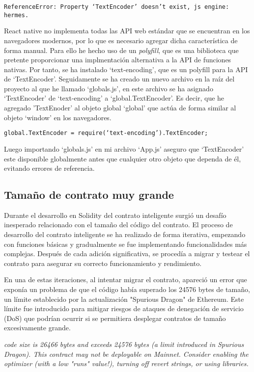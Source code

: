 \texttt{ReferenceError: Property `TextEncoder' doesn't exist, js engine: hermes.}

React native no implementa todas las API web estándar que se encuentran en los navegadores modernos, por lo que es necesario agregar dicha característica de forma manual. Para ello he hecho uso de un \textit{polyfill}, que es una biblioteca que pretente proporcionar una implmentación alternativa a la API de funciones nativas.
Por tanto, se ha instalado `text-encoding', que es un polyfill para la API de `TextEncoder'.
Seguidamente se ha creado un nuevo archivo en la raíz del proyecto al que he llamado `globals.js', en este archivo se ha asignado `TextEncoder' de `text-encoding' a `global.TextEncoder'. Es decir, que he agregado 'TextEnoder' al objeto global `global' que actúa de forma similar al objeto `window' en los navegadores.

\texttt{global.TextEncoder = require(`text-encoding').TextEncoder;}

Luego importando `globals.js' en mi archivo `App.js' aseguro que `TextEncoder' este disponible globalmente antes que cualquier otro objeto que dependa de él, evitando errores de referencia.


\subsection{Tamaño de contrato muy grande}

Durante el desarrollo en Solidity del contrato inteligente surgió un desafío inesperado relacionado con el tamaño del código del contrato.
El proceso de desarrollo del contrato inteligente se ha realizado de forma iterativa, empezando con funciones básicas y gradualmente se fue implementando funcionalidades más complejas. Después de cada adición significativa, se procedía a migrar y testear el contrato para asegurar su correcto funcionamiento y rendimiento.

En una de estas iteraciones, al intentar migrar el contrato, apareció un error que exponía un problema de que el código había superado los 24576 bytes de tamaño, un límite establecido por la actualización "Spurious Dragon" de Ethereum. Este límite fue introducido para mitigar riesgos de ataques de denegación de servicio (DoS) que podrían ocurrir si se permitiera desplegar contratos de tamaño excesivamente grande.

\textit{code size is 26466 bytes and exceeds 24576 bytes (a limit introduced in Spurious Dragon). This contract may not be deployable on Mainnet. Consider enabling the optimizer (with a low "runs" value!), turning off revert strings, or using libraries.}

